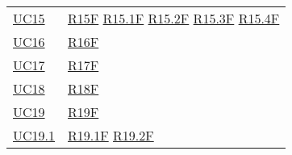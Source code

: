 \begin{center}
\begin{longtable}[!h]{m{50px} m{50px}}
        \hyperref[sec:UC15]{UC15}         & \hyperref[tab:RequisitiFunzionali]{R15F}
        \newline \hyperref[tab:RequisitiFunzionali]{R15.1F}
        \newline \hyperref[tab:RequisitiFunzionali]{R15.2F}
        \newline \hyperref[tab:RequisitiFunzionali]{R15.3F}
        \newline \hyperref[tab:RequisitiFunzionali]{R15.4F}                            \\

        \hyperref[sec:UC16]{UC16}         & \hyperref[tab:RequisitiFunzionali]{R16F}   \\
        \hyperref[sec:UC17]{UC17}         & \hyperref[tab:RequisitiFunzionali]{R17F}   \\
        \hyperref[sec:UC18]{UC18}         & \hyperref[tab:RequisitiFunzionali]{R18F}   \\
        \hyperref[sec:UC19]{UC19}         & \hyperref[tab:RequisitiFunzionali]{R19F}   \\

        \hyperref[sec:UC19.1]{UC19.1}     & \hyperref[tab:RequisitiFunzionali]{R19.1F}
        \newline \hyperref[tab:RequisitiFunzionali]{R19.2F}                            \\


\end{longtable}
\end{center}
